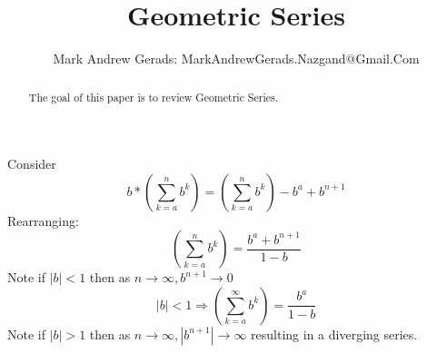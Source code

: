 \documentclass[]{article}
\author{Mark Andrew Gerads: MarkAndrewGerads.Nazgand@Gmail.Com}
\title{Geometric Series}
\newcommand{\pqty}[1]{{\left(#1\right)}}
\newcommand{\abs}[1]{{\left\lvert#1\right\rvert}}
\numberwithin{equation}{section}
\begin{document}
	
	\maketitle
	
	\begin{abstract}
		The goal of this paper is to review Geometric Series.
	\end{abstract}
	
	Consider
	\begin{equation}
		b*\pqty{\sum_{k=a}^{n} b^k}
		=\pqty{\sum_{k=a}^{n} b^k}-b^a+b^{n+1}
	\end{equation}
	Rearranging:
	\begin{equation}
	\pqty{\sum_{k=a}^{n} b^k}
	=\frac{b^a+b^{n+1}}{1-b}
	\end{equation}
	Note if \(\abs{b}<1\) then as \(n\to\infty, b^{n+1}\to 0\)
	\begin{equation}
	\label{GeometricSeries}
	\abs{b}<1\Rightarrow
	\pqty{\sum_{k=a}^{\infty} b^k}
	=\frac{b^a}{1-b}
	\end{equation}
	Note if \(\abs{b}>1\) then as \(n\to\infty, \abs{b^{n+1}}\to \infty\) resulting in a diverging series.
\end{document}
